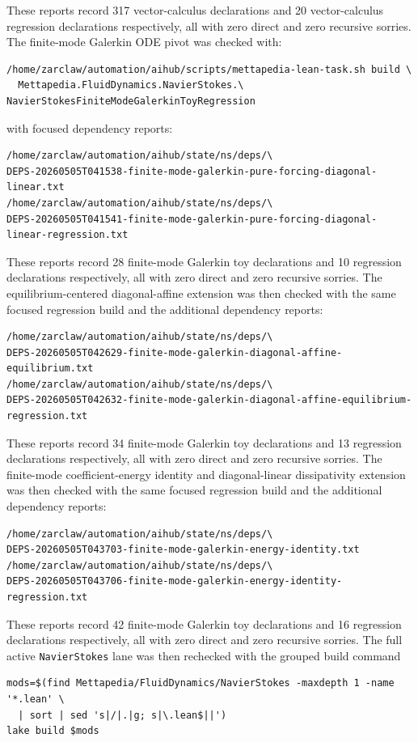 \documentclass[11pt]{article}
\begin{document}
These reports record 317 vector-calculus declarations and 20 vector-calculus
regression declarations respectively, all with zero direct and zero recursive
sorries.
The finite-mode Galerkin ODE pivot was checked with:
\begin{verbatim}
/home/zarclaw/automation/aihub/scripts/mettapedia-lean-task.sh build \
  Mettapedia.FluidDynamics.NavierStokes.\
NavierStokesFiniteModeGalerkinToyRegression
\end{verbatim}
with focused dependency reports:
\begin{verbatim}
/home/zarclaw/automation/aihub/state/ns/deps/\
DEPS-20260505T041538-finite-mode-galerkin-pure-forcing-diagonal-linear.txt
/home/zarclaw/automation/aihub/state/ns/deps/\
DEPS-20260505T041541-finite-mode-galerkin-pure-forcing-diagonal-linear-regression.txt
\end{verbatim}
These reports record 28 finite-mode Galerkin toy declarations and 10
regression declarations respectively, all with zero direct and zero recursive
sorries.
The equilibrium-centered diagonal-affine extension was then checked with the
same focused regression build and the additional dependency reports:
\begin{verbatim}
/home/zarclaw/automation/aihub/state/ns/deps/\
DEPS-20260505T042629-finite-mode-galerkin-diagonal-affine-equilibrium.txt
/home/zarclaw/automation/aihub/state/ns/deps/\
DEPS-20260505T042632-finite-mode-galerkin-diagonal-affine-equilibrium-regression.txt
\end{verbatim}
These reports record 34 finite-mode Galerkin toy declarations and 13
regression declarations respectively, all with zero direct and zero recursive
sorries.
The finite-mode coefficient-energy identity and diagonal-linear dissipativity
extension was then checked with the same focused regression build and the
additional dependency reports:
\begin{verbatim}
/home/zarclaw/automation/aihub/state/ns/deps/\
DEPS-20260505T043703-finite-mode-galerkin-energy-identity.txt
/home/zarclaw/automation/aihub/state/ns/deps/\
DEPS-20260505T043706-finite-mode-galerkin-energy-identity-regression.txt
\end{verbatim}
These reports record 42 finite-mode Galerkin toy declarations and 16
regression declarations respectively, all with zero direct and zero recursive
sorries.
The full active \texttt{NavierStokes} lane was then rechecked with the grouped
build command
\begin{verbatim}
mods=$(find Mettapedia/FluidDynamics/NavierStokes -maxdepth 1 -name '*.lean' \
  | sort | sed 's|/|.|g; s|\.lean$||')
lake build $mods
\end{verbatim}
\end{document}
